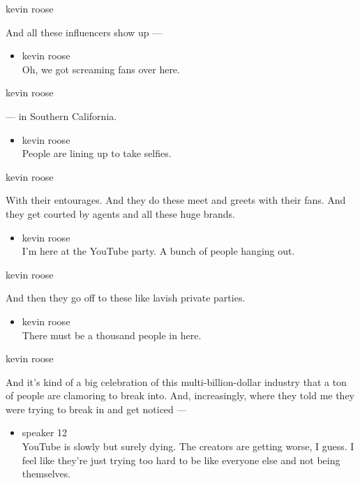 kevin roose

And all these influencers show up ---

\begin{itemize}
\tightlist
\item
  kevin roose\\
  Oh, we got screaming fans over here.
\end{itemize}

kevin roose

--- in Southern California.

\begin{itemize}
\tightlist
\item
  kevin roose\\
  People are lining up to take selfies.
\end{itemize}

kevin roose

With their entourages. And they do these meet and greets with their
fans. And they get courted by agents and all these huge brands.

\begin{itemize}
\tightlist
\item
  kevin roose\\
  I'm here at the YouTube party. A bunch of people hanging out.
\end{itemize}

kevin roose

And then they go off to these like lavish private parties.

\begin{itemize}
\tightlist
\item
  kevin roose\\
  There must be a thousand people in here.
\end{itemize}

kevin roose

And it's kind of a big celebration of this multi-billion-dollar industry
that a ton of people are clamoring to break into. And, increasingly,
where they told me they were trying to break in and get noticed ---

\begin{itemize}
\tightlist
\item
  speaker 12\\
  YouTube is slowly but surely dying. The creators are getting worse, I
  guess. I feel like they're just trying too hard to be like everyone
  else and not being themselves.
\end{itemize}

